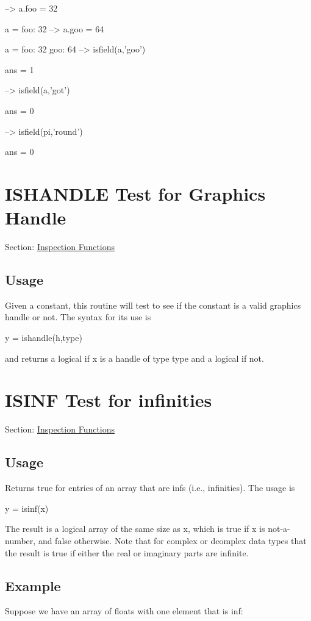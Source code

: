 \begin{DoxyVerbInclude}
--> a.foo = 32

a = 
    foo: 32
--> a.goo = 64

a = 
    foo: 32
    goo: 64
--> isfield(a,'goo')

ans = 
 1 

--> isfield(a,'got')

ans = 
 0 

--> isfield(pi,'round')

ans = 
 0 
\end{DoxyVerbInclude}
 \hypertarget{inspection_ishandle}{}\section{I\-S\-H\-A\-N\-D\-L\-E Test for Graphics Handle}\label{inspection_ishandle}
Section\-: \hyperlink{sec_inspection}{Inspection Functions} \hypertarget{vtkwidgets_vtkxyplotwidget_Usage}{}\subsection{Usage}\label{vtkwidgets_vtkxyplotwidget_Usage}
Given a constant, this routine will test to see if the constant is a valid graphics handle or not. The syntax for its use is \begin{DoxyVerb}  y = ishandle(h,type)
\end{DoxyVerb}
 and returns a logical {} if {\ttfamily x} is a handle of type {\ttfamily type} and a logical {} if not. \hypertarget{inspection_isinf}{}\section{I\-S\-I\-N\-F Test for infinities}\label{inspection_isinf}
Section\-: \hyperlink{sec_inspection}{Inspection Functions} \hypertarget{vtkwidgets_vtkxyplotwidget_Usage}{}\subsection{Usage}\label{vtkwidgets_vtkxyplotwidget_Usage}
Returns true for entries of an array that are infs (i.\-e., infinities). The usage is \begin{DoxyVerb}   y = isinf(x)
\end{DoxyVerb}
 The result is a logical array of the same size as {\ttfamily x}, which is true if {\ttfamily x} is not-\/a-\/number, and false otherwise. Note that for {\ttfamily complex} or {\ttfamily dcomplex} data types that the result is true if either the real or imaginary parts are infinite. \hypertarget{variables_struct_Example}{}\subsection{Example}\label{variables_struct_Example}
Suppose we have an array of floats with one element that is {\ttfamily inf}\-:


